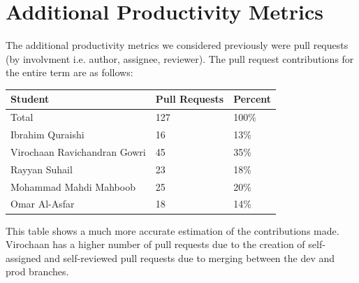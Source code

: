 \documentclass{article}
\begin{document}
\section{Additional Productivity Metrics}

The additional productivity metrics we considered previously were pull requests (by involvment i.e. author, assignee, reviewer). The pull request contributions for the entire term are as follows: 

\begin{table}[H]
\centering
\begin{tabular}{lll}
\toprule
\textbf{Student} & \textbf{Pull Requests} & \textbf{Percent}\\
\midrule
Total & 127 & 100\% \\
Ibrahim Quraishi & 16 & 13\% \\
Virochaan Ravichandran Gowri & 45 & 35\% \\
Rayyan Suhail & 23 & 18\% \\
Mohammad Mahdi Mahboob & 25 & 20\% \\
Omar Al-Asfar & 18 & 14\% \\
\bottomrule
\end{tabular}
\end{table}

This table shows a much more accurate estimation of the contributions made. Virochaan has a higher number of pull requests due to the creation of self-assigned and self-reviewed pull requests due to merging between the dev and prod branches.
\end{document}
